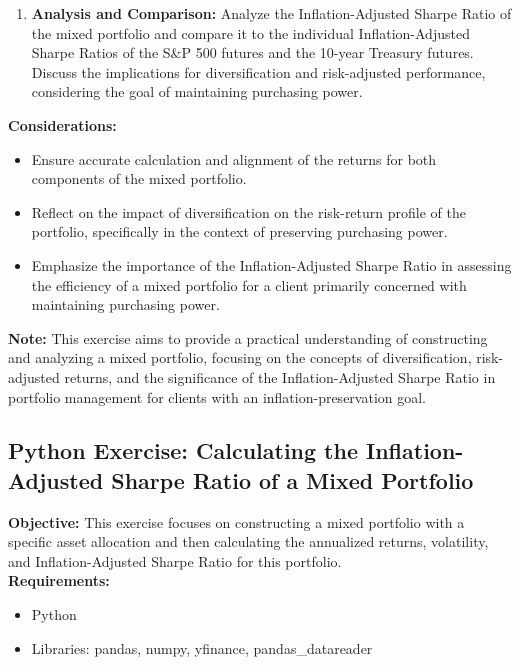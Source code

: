 \documentclass{article}
\begin{document}
\begin{enumerate}
    \item \textbf{Analysis and Comparison:} Analyze the Inflation-Adjusted Sharpe Ratio of the mixed portfolio and compare it to the individual Inflation-Adjusted Sharpe Ratios of the S\&P 500 futures and the 10-year Treasury futures. Discuss the implications for diversification and risk-adjusted performance, considering the goal of maintaining purchasing power.
\end{enumerate}

\textbf{Considerations:}
\begin{itemize}
    \item Ensure accurate calculation and alignment of the returns for both components of the mixed portfolio.
    \item Reflect on the impact of diversification on the risk-return profile of the portfolio, specifically in the context of preserving purchasing power.
    \item Emphasize the importance of the Inflation-Adjusted Sharpe Ratio in assessing the efficiency of a mixed portfolio for a client primarily concerned with maintaining purchasing power.
\end{itemize}

\textbf{Note:} This exercise aims to provide a practical understanding of constructing and analyzing a mixed portfolio, focusing on the concepts of diversification, risk-adjusted returns, and the significance of the Inflation-Adjusted Sharpe Ratio in portfolio management for clients with an inflation-preservation goal.

\subsection{Python Exercise: Calculating the Inflation-Adjusted Sharpe Ratio of a Mixed Portfolio}

\textbf{Objective:} This exercise focuses on constructing a mixed portfolio with a specific asset allocation and then calculating the annualized returns, volatility, and Inflation-Adjusted Sharpe Ratio for this portfolio. \\

\textbf{Requirements:}
\begin{itemize}
    \item Python
    \item Libraries: pandas, numpy, yfinance, pandas\_datareader
\end{itemize}
\end{document}
